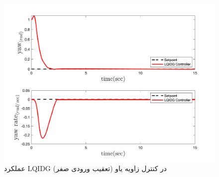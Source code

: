 \begin{figure}[H]
	\includegraphics[width=12cm]{../Figures/MIL/LQIDG/3DOF/lqidg_yaw.png}
	\centering
	\caption{عملكرد LQIDG در کنترل زاويه یاو (تعقیب ورودی صفر)}
\end{figure}


